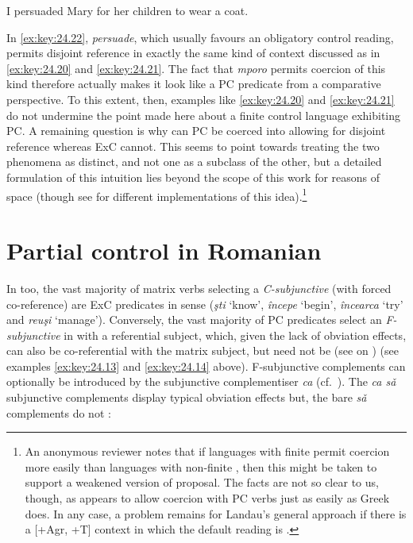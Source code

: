 \documentclass[output=paper]{langsci/langscibook}
\begin{document}
\ea%
    \label{ex:key:24.22}
    I persuaded Mary for her children to wear a coat.
\z

In \eqref{ex:key:24.22}, \emph{persuade}, which usually favours an obligatory
control reading, permits disjoint reference in exactly the same kind of context
discussed as in \eqref{ex:key:24.20} and \eqref{ex:key:24.21}. The fact that
\emph{mporo} permits coercion of this kind therefore actually makes it look
like a \gls{PC} predicate from a comparative
perspective.  To this extent, then, examples like \eqref{ex:key:24.20} and
\eqref{ex:key:24.21} do not undermine the point made here about a finite
control language exhibiting PC. A remaining question is why can
\gls{PC} be coerced into allowing for disjoint
reference whereas \gls{ExC} cannot. This seems
to point towards treating the two phenomena as distinct, and not one as a
subclass of the other, but a detailed formulation of this intuition lies beyond
the scope of this work for reasons of space (though see
\citealt{Cinque2006,Landau2000,Landau2008,Landau2015,Sheehan2018b} for
different implementations of this idea).\footnote{An anonymous reviewer notes
    that if languages with finite  permit coercion more easily than
    languages with non-finite , then this might be taken to support a
    weakened version of  proposal. The facts are not so
    clear to us, though, as  appears to allow coercion with
\gls{PC} verbs just as easily as Greek does. In any
case, a problem remains for Landau’s general approach if there is a [+Agr, +T]
context in which the default reading is .}

\section{Partial control in Romanian}\label{sec:key:24.4}

In  too, the vast majority of matrix verbs selecting a
\emph{C-subjunctive} (with forced co-reference) are
\gls{ExC} predicates in 
sense (\emph{şti} ‘know’, \emph{începe} ‘begin’, \emph{încearca} ‘try’ and
\emph{reuş}\emph{i} ‘manage’). Conversely, the vast majority of
\gls{PC} predicates select an \emph{F-subjunctive}
in  with a referential subject, which, given the lack of obviation
effects, can also be co-referential with the matrix subject, but need not be
(see \citealt{Alboiu2007,AlexiadouEtAl2010,Hill2012,Nicolae2013}
on ) (see examples \eqref{ex:key:24.13} and \eqref{ex:key:24.14}
above). F-subjunctive complements can optionally be introduced by the
subjunctive complementiser \emph{ca} (cf.\
\citealt{GrosuHorvath1987,Hill2012}). The \emph{ca sǎ} subjunctive complements
display typical \ili{Romance} obviation effects but, the bare \emph{sǎ} complements
do not \citep{AlexiadouEtAl2010}:
\end{document}
